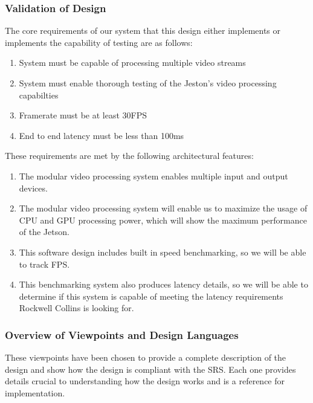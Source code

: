 \subsubsection{Validation of Design}
The core requirements of our system that this design either implements or implements the
capability of testing are as follows:\\
\begin{enumerate}[leftmargin=2cm,labelindent=2cm]
\item System must be capable of processing multiple video streams
\item System must enable thorough testing of the Jeston's video processing capabilties
\item Framerate must be at least 30FPS
\item End to end latency must be less than 100ms\\
\end{enumerate}

These requirements are met by the following architectural features:\\
\begin{enumerate}[leftmargin=2cm,labelindent=2cm]
\item The modular video processing system enables multiple input and output devices.
\item The modular video processing system will enable us to maximize the usage of CPU and GPU
processing power, which will show the maximum performance of the Jetson.
\item This software design includes built in speed benchmarking, so we will be able to track FPS.
\item This benchmarking system also produces latency details, so we will be able to determine if this
system is capable of meeting the latency requirements Rockwell Collins is looking for.\\
\end{enumerate}

\subsubsection{Overview of Viewpoints and Design Languages}
These viewpoints have been chosen to provide a complete description of the design and show
how the design is compliant with the SRS. Each one provides details crucial to understanding how the
design works and is a reference for implementation.\\

